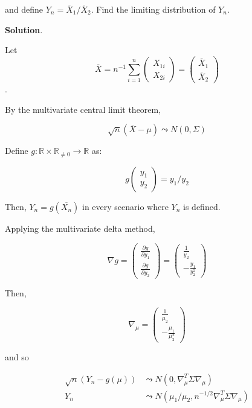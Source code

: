 and define \(Y_n = \overline{X}_1 \big/ \overline{X}_2\). Find the
limiting distribution of \(Y_n\).

\textbf{Solution}.

Let
\[\overline{X} = n^{-1} \sum_{i=1}^n \begin{pmatrix} X_{1i} \\ X_{2i} \end{pmatrix} = \begin{pmatrix} \overline{X}_1 \\ \overline{X}_2 \end{pmatrix}\].

By the multivariate central limit theorem,

\[
\sqrt{n}(\overline{X} - \mu) \leadsto N(0, \Sigma)
\]

Define
\(g: \mathbb{R} \times \mathbb{R}_{\neq 0} \rightarrow \mathbb{R}\) as:

\[
g \begin{pmatrix} y_1 \\ y_2 \end{pmatrix} = y_1 / y_2
\]

Then, \(Y_n = g(\overline{X_n})\) in every scenario where \(Y_n\) is
defined.

Applying the multivariate delta method,

\[ \nabla g 
= \begin{pmatrix} \frac{\partial g}{\partial y_1} \\ \frac{\partial g}{\partial y_2} \end{pmatrix} 
= \begin{pmatrix} \frac{1}{y_2} \\ -\frac{y_1}{y_2^2} \end{pmatrix} 
\]

Then,

\[ \nabla_\mu 
= \begin{pmatrix} \frac{1}{\mu_2} \\ -\frac{\mu_1}{\mu_2^2} \end{pmatrix} 
\]

and so

\begin{align}
\sqrt{n}(Y_n - g(\mu)) & \leadsto N(0, \nabla_\mu^T \Sigma \nabla_\mu)  \\
Y_n & \leadsto N(\mu_1 / \mu_2, n^{-1/2} \nabla_\mu^T \Sigma \nabla_\mu) 
\end{align}

